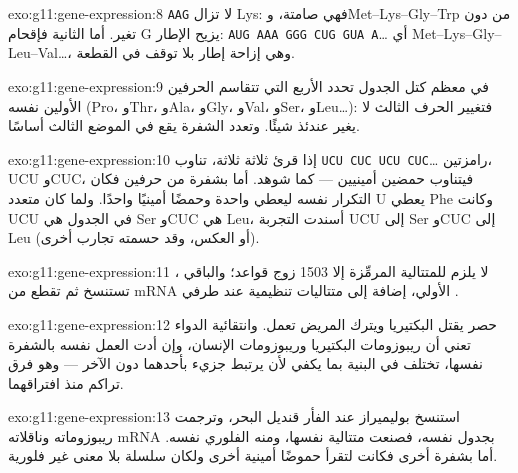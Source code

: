 \begin{solution}{exo:g11:gene-expression:8}
\texttt{AAG} لا تزال Lys: فهي صامتة، وMet--Lys--Gly--Trp من دون تغير.
أما الثانية فإقحام G يزيح الإطار: \texttt{AUG AAA GGG
CUG GUA A}\dots{} أي Met--Lys--Gly--Leu--Val\dots، وهي إزاحة إطار بلا
توقف في القطعة.
\end{solution}

\begin{solution}{exo:g11:gene-expression:9}
في معظم كتل الجدول تحدد  الأربع التي تتقاسم الحرفين الأولين
 نفسه (Pro، وThr، وAla، وGly، وVal، وSer، وLeu\dots): فتغيير
الحرف الثالث لا يغير عندئذ شيئًا. وتعدد الشفرة يقع في الموضع الثالث
أساسًا.
\end{solution}

\begin{solution}{exo:g11:gene-expression:10}
إذا قرئ ثلاثة ثلاثة، تناوب \texttt{UCU CUC UCU CUC}\dots{} رامزتين،
UCU وCUC، فيتناوب  حمضين أمينيين --- كما شوهد. أما بشفرة من
حرفين فكان التكرار نفسه ليعطي  واحدة وحمضًا أمينيًا واحدًا. ولما
كان متعدد U يعطي Phe وكانت UCU في الجدول هي Ser وCUC هي Leu، أسندت
التجربة UCU إلى Ser وCUC إلى Leu (أو العكس، وقد حسمته تجارب أخرى).
\end{solution}

\begin{solution}{exo:g11:gene-expression:11}
لا يلزم للمتتالية المرمِّزة إلا 1503 زوج قواعد؛ والباقي ،
تستنسخ ثم تقطع من mRNA الأولي، إضافة إلى متتاليات تنظيمية عند طرفي
.
\end{solution}

\begin{solution}{exo:g11:gene-expression:12}
حصر  يقتل البكتيريا ويترك  المريض تعمل. وانتقائية الدواء
تعني أن ريبوزومات البكتيريا وريبوزومات الإنسان، وإن أدت العمل نفسه
بالشفرة نفسها، تختلف في البنية بما يكفي لأن يرتبط جزيء بأحدهما دون
الآخر --- وهو فرق تراكم منذ افتراقهما.
\end{solution}

\begin{solution}{exo:g11:gene-expression:13}
استنسخ بوليميراز  عند الفأر  قنديل البحر، وترجمت ريبوزوماته
وناقلاته mRNA بجدول  نفسه، فصنعت متتالية 
نفسها، ومنه  الفلوري نفسه. أما بشفرة أخرى فكانت 
لتقرأ حموضًا أمينية أخرى ولكان  سلسلة بلا معنى غير فلورية.
\end{solution}

